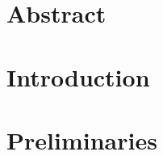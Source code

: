 \documentclass[12pt,oneside]{report}
\begin{document}
\chapter*{Abstract}

\tableofcontents
\listoffigures
\listoftables

\cleardoublepage
{}

\chapter{Introduction}
\label{chap:intro}


\chapter{Preliminaries}
\label{chap:theory}




\end{document}

